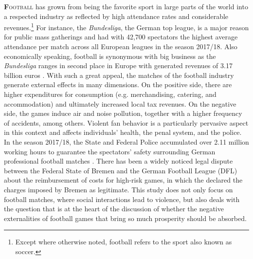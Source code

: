 
\lettrine[lines=2,nindent=0pt]{\color{darkgray}\textbf{F}}{ootball} has grown from being the favorite sport in large parts of the world into a respected industry as reflected by high attendance rates and considerable revenues.\footnote{Except where otherwise noted, football refers to the sport also known as soccer.} For instance, the \textit{Bundesliga}, the German top league, is a major reason for public mass gatherings and had with 42,700 spectators the highest average attendance per match across all European leagues in the season 2017/18. Also economically speaking, football is synonymous with big business as the \textit{Bundesliga} ranges in second place in Europe with generated revenues of 3.17 billion euros \citep{deloitte2019report}. With such a great appeal, the matches of the football industry generate external effects in many dimensions. On the positive side, there are higher expenditures for consumption (e.g. merchandising, catering, and accommodation) and ultimately increased local tax revenues. On the negative side, the games induce air and noise pollution, together with a higher frequency of accidents, among others. Violent fan behavior is a particularly pervasive aspect in this context and affects individuals' health, the penal system, and the police. In the season 2017/18, the State and Federal Police accumulated over 2.11 million working hours to guarantee the spectators' safety surrounding German professional football matches \citep{zis17_18}. There has been a widely noticed legal dispute between the Federal State of Bremen and the German Football League (DFL) about the reimbursement of costs for high-risk games, in which the \cite{fac_2019} declared the charges imposed by Bremen as legitimate. This study does not only focus on football matches, where social interactions lead to violence, but also deals with the question that is at the heart of the discussion of whether the negative externalities of football games that bring so much prosperity should be absorbed. 




